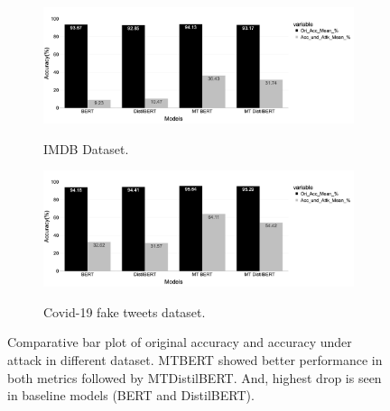 \documentclass[%
	BCOR=8mm, %
	DIV=12,
	toc=bibliography, %
	toc=listof, %
	oneside, %
	egregdoesnotlikesansseriftitles, %
	]{scrbook}
\begin{document}

\begin{figure}[H]
    \centering
    \begin{subfigure}
            \centering
            \includegraphics[width=.8\linewidth]{img/MOAandAUA_Imdb.png}
            \caption{IMDB Dataset.}{}
               \label{fig:}
        \end{subfigure}
    \begin{subfigure}
            \centering
            \includegraphics[width=.8\linewidth]{img/MOAandAUA_fknews}
            \caption{Covid-19 fake tweets dataset.}{}
              \label{fig:sub2}
        \end{subfigure}
 \caption[Comparative bar plot of original accuracy and accuracy under attack]{\small Comparative bar plot of original accuracy and accuracy under attack in different dataset. MTBERT showed better performance in both metrics followed by MTDistilBERT. And, highest drop is seen in baseline models (BERT and DistilBERT).}
\end{figure}
\end{document}
